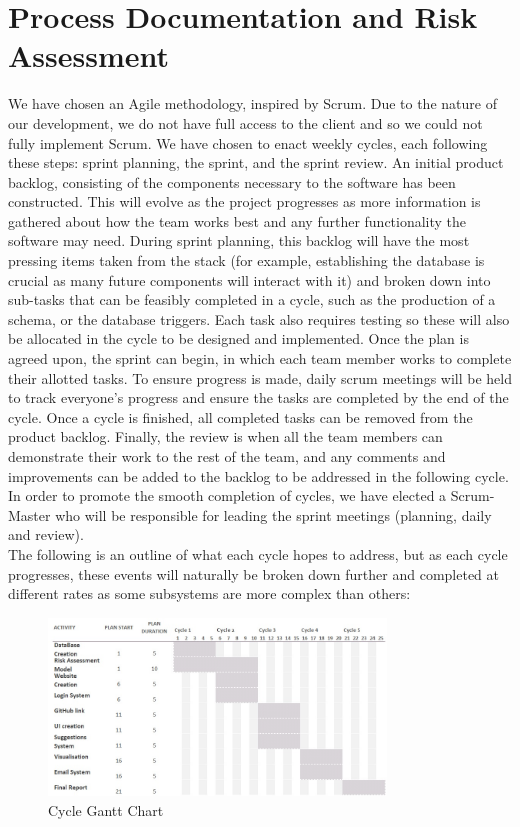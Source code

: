 \documentclass[a4paper]{article}
\theoremstyle{plain}
\theoremstyle{definition}
\theoremstyle{remark}
\begin{document}
\section*{Process Documentation and Risk Assessment}
We have chosen an Agile methodology, inspired by Scrum. Due to the nature of our development, we do not have full access to the client and so we could not fully implement Scrum. We have chosen to enact weekly cycles, each following these steps: sprint planning, the sprint, and the sprint review. An initial product backlog, consisting of the components necessary to the software has been constructed. This will evolve as the project progresses as more information is gathered about how the team works best and any further functionality the software may need. During sprint planning, this backlog will have the most pressing items taken from the stack (for example, establishing the database is crucial as many future components will interact with it) and broken down into sub-tasks that can be feasibly completed in a cycle, such as the production of a schema, or the database triggers. Each task also requires testing so these will also be allocated in the cycle to be designed and implemented. Once the plan is agreed upon, the sprint can begin, in which each team member works to complete their allotted tasks. To ensure progress is made, daily scrum meetings will be held to track everyone’s progress and ensure the tasks are completed by the end of the cycle. Once a cycle is finished, all completed tasks can be removed from the product backlog. Finally, the review is when all the team members can demonstrate their work to the rest of the team, and any comments and improvements can be added to the backlog to be addressed in the following cycle. In order to promote the smooth completion of cycles, we have elected a Scrum-Master who will be responsible for leading the sprint meetings (planning, daily and review). \\

\noindent The following is an outline of what each cycle hopes to address, but as each cycle progresses, these events will naturally be broken down further and completed at different rates as some subsystems are more complex than others:
\begin{figure}[H]
	\centering
	\includegraphics[width=0.8\textwidth]{Gantt.jpeg}
	\caption{Cycle Gantt Chart}
	\label{fig:cgc}
\end{figure}
\end{document}
